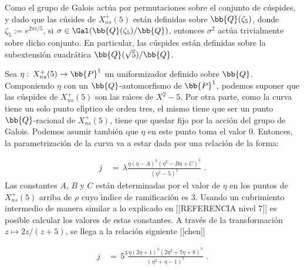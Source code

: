 Como el grupo de Galois act\'{u}a por permutaciones sobre el conjunto de
c\'{u}spides, y dado que las c\'{u}sides de $X_{ns}^{+}(5)$ est\'{a}n
definidas sobre $\bb{Q}(\zeta_{5})$, donde $\zeta_{5}:=e^{2\pi i/5}$,
si $\sigma\in\Gal(\bb{Q}(\zeta_{5})/\bb{Q})$, entonces $\sigma^{2}$
act\'{u}a trivialmente sobre dicho conjunto. En particular, las c\'{u}spides
est\'{a}n definidas sobre la subextensi\'{o}n cuadr\'{a}tica
$\bb{Q}(\sqrt{5})/\bb{Q}$.

Sea $\eta:\,X_{ns}^{+}(5)\rightarrow\bb{P}^{1}$ un uniformizador definido
sobre $\bb{Q}$. Componiendo $\eta$ con un $\bb{Q}$-automorfismo de
$\bb{P}^{1}$, podemos suponer que las c\'{u}spides de $X_{ns}^{+}(5)$ son
las ra\'{\i}ces de $X^{2}-5$. Por otra parte, como la curva tiene un
solo punto el\'{\i}ptico de orden tres, el mismo tiene que ser un punto
$\bb{Q}$-racional de $X_{ns}^{+}(5)$, tiene que quedar fijo por la
acci\'{o}n del grupo de Galois. Podemos asumir tambi\'{e}n que
$\eta$ en este punto toma el valor $0$.
Entonces, la parametrizaci\'{o}n de la curva va a estar dada por una
relaci\'{o}n de la forma:

\begin{align*}
j & \,=\,\lambda
\frac{\eta(\eta-A)^{3}(\eta^{2}-B\eta+C)^{3}}{(\eta^{2}-5)^{5}}\text{ .}
\end{align*}
Las constantes $A$, $B$ y $C$ est\'{a}n determinadas por el valor de $\eta$
en los puntos de $X_{ns}^{+}(5)$ arriba de $\rho$ cuyo \'{\i}ndice de
ramificaci\'{o}n es $3$. Usando un cubrimiento intermedio de manera
similar a lo explicado en [[REFERENCIA nivel $7$]] es posible calcular los
valores de estas constantes. A trav\'{e}s de la transformaci\'{o}n
$z\mapsto 2z/(z+5)$, se llega a la relaci\'{o}n siguiente [[chen]]

\begin{align*}
j & \,=\,5^{3}
\frac{\eta(2\eta+1)^{3}(2\eta^{2}+7\eta+8)^{3}}{(\eta^{2}+\eta-1)^{5}}
\text{ .}
\end{align*}


